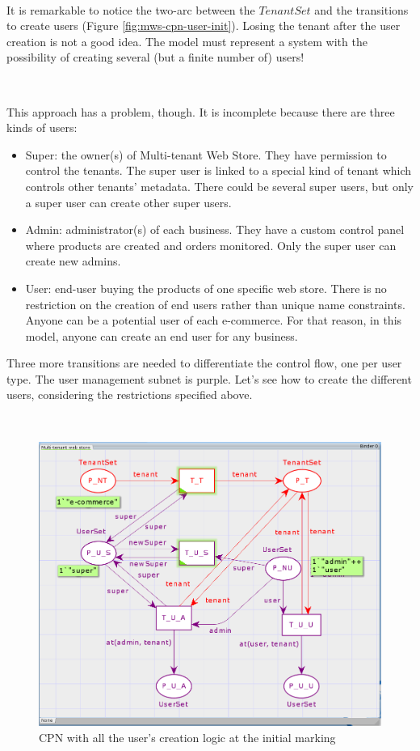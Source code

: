 \documentclass[12pt,english]{article} %
\begin{document}
\

It is remarkable to notice the two-arc between the $TenantSet$ and the transitions to create users (Figure \ref{fig:mws-cpn-user-init}).
Losing the tenant after the user creation is not a good idea.
The model must represent a system with the possibility of creating several (but a finite number of) users!

\

This approach has a problem, though.
It is incomplete because there are three kinds of users:
\begin{itemize}
    \item Super: the owner(s) of Multi-tenant Web Store.
    They have permission to control the tenants.
    The super user is linked to a special kind of tenant which controls other tenants' metadata.
    There could be several super users, but only a super user can create other super users.
    \item Admin: administrator(s) of each business.
    They have a custom control panel where products are created and orders monitored.
    Only the super user can create new admins.
    \item User: end-user buying the products of one specific web store.
    There is no restriction on the creation of end users rather than unique name constraints.
    Anyone can be a potential user of each e-commerce.
    For that reason, in this model, anyone can create an end user for any business.
\end{itemize}

Three more transitions are needed to differentiate the control flow, one per user type.
The user management subnet is purple.
Let's see how to create the different users, considering the restrictions specified above.

\

\begin{figure}[H]
    \centering
    \includegraphics[scale=0.55]{img/mws/cpn/mws_cpn_all_users_initial.png}
    \caption{CPN with all the user's creation logic at the initial marking}
    \label{fig:mws-cpn-all-users-initial}
\end{figure}
\end{document}
